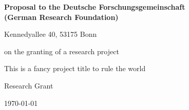 {

  \vspace*{20ex}

  \begin{center}
  \large

  {\bfseries Proposal to the Deutsche Forschungsgemeinschaft\\(German Research Foundation)}

  Kennedyallee 40, 53175 Bonn

  \vspace{4ex}

  on the granting of a research project

  \vspace{9ex}

  \begin{bfseries}
    This is a fancy project title to rule the world
  \end{bfseries}

  \medskip

	 Research Grant

  \vspace{9ex}

	\vspace{9ex}

	\today
  \end{center}
}
